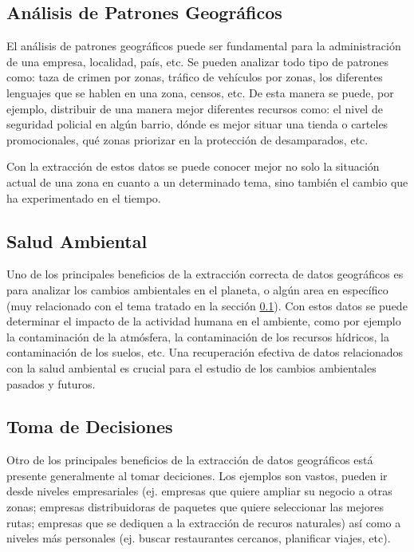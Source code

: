 \documentclass{llncs}
\begin{document}
\subsection{Análisis de Patrones Geográficos}\label{sec:patr}

El análisis de patrones geográficos puede ser fundamental para la administración
de una empresa, localidad, país, etc. Se pueden analizar todo tipo de patrones
como: taza de crimen por zonas, tráfico de vehículos por zonas, los diferentes
lenguajes que se hablen en una zona, censos, etc. De esta manera se puede, por ejemplo,
distribuir de una manera mejor diferentes recursos como: el nivel de seguridad
policial en algún barrio, dónde es mejor situar una tienda o carteles promocionales,
qué zonas priorizar en la protección de desamparados, etc.

Con la extracción de estos datos se puede conocer mejor no solo la situación
actual de una zona en cuanto a un determinado tema, sino también el cambio que
ha experimentado en el tiempo.

\subsection{Salud Ambiental}\label{sec:pros}

Uno de los principales beneficios de la extracción correcta de datos
geográficos es para analizar los cambios ambientales \cite{scholten1991} en el
planeta, o algún area en específico (muy relacionado con el tema tratado en la
sección \ref{sec:patr}). Con estos datos se puede determinar el impacto de la
actividad humana en el ambiente, como por ejemplo la contaminación de la
atmósfera, la contaminación de los recursos hídricos, la contaminación de los
suelos, etc. Una recuperación efectiva de datos relacionados con la salud
ambiental es crucial para el estudio de los cambios ambientales pasados y
futuros.

\subsection{Toma de Decisiones}\label{sec:deci}

Otro de los principales beneficios de la extracción de datos geográficos está
presente generalmente al tomar deciciones. Los ejemplos son vastos, pueden ir
desde niveles empresariales (ej. empresas que quiere ampliar su negocio a otras
zonas; empresas distribuidoras de paquetes que quiere seleccionar las mejores
rutas; empresas que se dediquen a la extracción de recuros naturales) así como
a niveles más personales (ej. buscar restaurantes cercanos, planificar viajes, etc).
\end{document}
